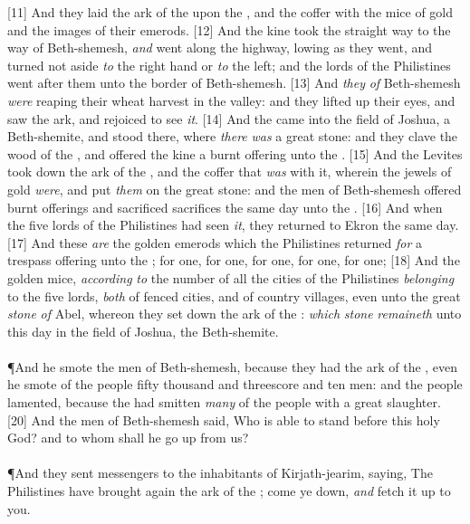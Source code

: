 [11] \textcolor[cmyk]{0.99998,1,0,0}{And they laid the ark of the  upon the , and the coffer with the mice of gold and the images of their emerods.}
[12] \textcolor[cmyk]{0.99998,1,0,0}{And the kine took the straight way to the way of Beth-shemesh, \emph{and} went along the highway, lowing as they went, and turned not aside \emph{to} the right hand or \emph{to} the left; and the lords of the Philistines went after them unto the border of Beth-shemesh.}
[13] \textcolor[cmyk]{0.99998,1,0,0}{And \emph{they} \emph{of} Beth-shemesh \emph{were} reaping their wheat harvest in the valley: and they lifted up their eyes, and saw the ark, and rejoiced to see \emph{it}.}
[14] \textcolor[cmyk]{0.99998,1,0,0}{And the  came into the field of Joshua, a Beth-shemite, and stood there, where \emph{there} \emph{was} a great stone: and they clave the wood of the , and offered the kine a burnt offering unto the .}
[15] \textcolor[cmyk]{0.99998,1,0,0}{And the Levites took down the ark of the , and the coffer that \emph{was} with it, wherein the jewels of gold \emph{were}, and put \emph{them} on the great stone: and the men of Beth-shemesh offered burnt offerings and sacrificed sacrifices the same day unto the .}
[16] \textcolor[cmyk]{0.99998,1,0,0}{And when the five lords of the Philistines had seen \emph{it}, they returned to Ekron the same day.}
[17] \textcolor[cmyk]{0.99998,1,0,0}{And these \emph{are} the golden emerods which the Philistines returned \emph{for} a trespass offering unto the ; for  one, for  one, for  one, for  one, for  one;}
[18] \textcolor[cmyk]{0.99998,1,0,0}{And the golden mice, \emph{according} \emph{to} the number of all the cities of the Philistines \emph{belonging} to the five lords, \emph{both} of fenced cities, and of country villages, even unto the great \emph{stone} \emph{of} Abel, whereon they set down the ark of the : \emph{which} \emph{stone} \emph{remaineth} unto this day in the field of Joshua, the Beth-shemite.}\\
\\
\P \textcolor[cmyk]{0.99998,1,0,0}{And he smote the men of Beth-shemesh, because they had  the ark of the , even he smote of the people fifty thousand and threescore and ten men: and the people lamented, because the  had smitten \emph{many} of the people with a great slaughter.}
[20] \textcolor[cmyk]{0.99998,1,0,0}{And the men of Beth-shemesh said, Who is able to stand before this holy  God? and to whom shall he go up from us?}\\
\\
\P \textcolor[cmyk]{0.99998,1,0,0}{And they sent messengers to the inhabitants of Kirjath-jearim, saying, The Philistines have brought again the ark of the ; come ye down, \emph{and} fetch it up to you.}